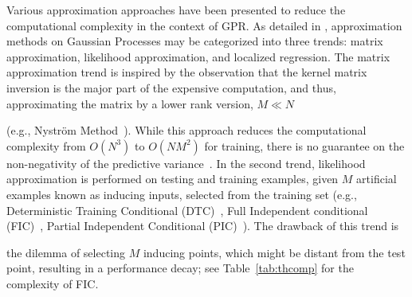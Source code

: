 
\begin{comment}
\hspace{0.08cm}
\begin{minipage}[b]{0.35\linewidth}
\centering
  \texttt{[image: figMInvSpeedUp.eps]}
  \vspace{1mm}
  \caption{Speedup of ODC framework prediction on either TGP or GPR while retrieving precomputed matrix inverses as $M$ increases, compared with computing them on test time by KNN scheme (log-log scale)}
  \label{fig:SpeedUp}
\end{minipage}
\end{figure*}
\begin{figure}
\centering
 \texttt{[image: Ekmeans57.png]}
 \vspace{4mm}
\caption{Assign and Balance-EKmeans on 300,000 random 2D points, K= 57 (best seen electronically).}
\end{figure}
\end{comment}

Various approximation approaches have  been presented to reduce the computational complexity in the context of GPR. As detailed in \cite{park11}, approximation methods on Gaussian Processes may be categorized into three trends: matrix approximation,
likelihood approximation, and localized regression. The matrix approximation trend is inspired by the observation that the kernel matrix inversion is the major part of the expensive computation, and thus, approximating the matrix by a lower rank version, $M \ll N$ (e.g.,  Nystr\"{o}m  Method~\cite{Nystrom01}). While this approach reduces the computational complexity from $O(N^3)$ to $O(N M^2)$ for training, there is no guarantee on the non-negativity of the predictive variance~\cite{Rasmussen:2005}. In the second trend,  likelihood approximation is performed on testing and training examples, given $M$ artificial examples known as inducing inputs, selected from the training set (e.g.,  Deterministic Training Conditional (DTC)~\cite{DTC03}, Full Independent conditional (FIC)~\cite{fic06}, Partial Independent Conditional (PIC)~\cite{pic07}). The drawback of this trend is the dilemma of selecting $M$ inducing points, which might be distant from the test point, resulting in a performance decay; see Table~\ref{tab:thcomp} for the complexity of FIC.


